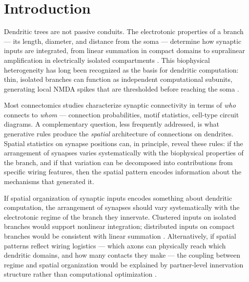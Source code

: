 \documentclass[11pt]{article}
\begin{document}
\begin{abstract}
compactly on compact branches even after conditioning on contact multiplicity (regime coefficient $= +0.95$, $p = 1.1 \times 10^{-107}$; equal-$k$ subsets: $p < 10^{-18}$ at every $k$), and that Martinotti cell (MC) contacts spread more broadly than BC contacts on compartmentalized branches (interaction $p = 5.2 \times 10^{-4}$). These results trace a multi-stage pathway --- electrotonic regime $\to$ afferent subtype composition $\to$ partner architecture $\to$ within-axon placement $\to$ synaptic spacing --- that partially decomposes the inhibitory residual and supports subtype-specific placement rules as a previously uncharacterized layer of inhibitory circuit organization.
\end{abstract}

\section{Introduction}

Dendritic trees are not passive conduits. The electrotonic properties of a branch --- its length, diameter, and distance from the soma --- determine how synaptic inputs are integrated, from linear summation in compact domains to supralinear amplification in electrically isolated compartments \citep{rall1967, london2005, koch1999}. This biophysical heterogeneity has long been recognized as the basis for dendritic computation: thin, isolated branches can function as independent computational subunits, generating local NMDA spikes that are thresholded before reaching the soma \citep{mel1994, polsky2004, poirazi2003, larkum2009}.

Most connectomics studies characterize synaptic connectivity in terms of \textit{who} connects to \textit{whom} --- connection probabilities, motif statistics, cell-type circuit diagrams. A complementary question, less frequently addressed, is what generative rules produce the \textit{spatial} architecture of connections on dendrites. Spatial statistics on synapse positions can, in principle, reveal these rules: if the arrangement of synapses varies systematically with the biophysical properties of the branch, and if that variation can be decomposed into contributions from specific wiring features, then the spatial pattern encodes information about the mechanisms that generated it.

If spatial organization of synaptic inputs encodes something about dendritic computation, the arrangement of synapses should vary systematically with the electrotonic regime of the branch they innervate. Clustered inputs on isolated branches would support nonlinear integration; distributed inputs on compact branches would be consistent with linear summation \citep{branco2010, mel1994}. Alternatively, if spatial patterns reflect wiring logistics --- which axons can physically reach which dendritic domains, and how many contacts they make --- the coupling between regime and spatial organization would be explained by partner-level innervation structure rather than computational optimization \citep{voruganti2026coupling}.
\end{document}
